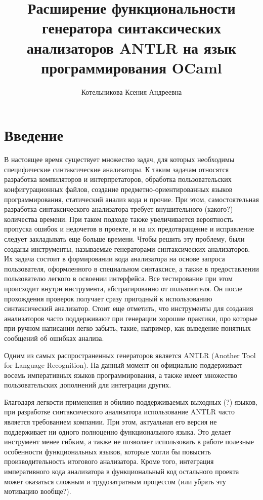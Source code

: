 \documentclass{article}
\title{Расширение функциональности генератора синтаксических анализаторов ANTLR на язык программирования OCaml}
\author{Котельникова Ксения Андреевна}
\begin{document}
\maketitle

\section{Введение}

В настоящее время существует множество задач, для которых необходимы специфические синтаксические анализаторы. 
К таким задачам относятся разработка компиляторов и интерпретаторов, обработка пользовательских конфигурационных файлов, создание предметно-ориентированных языков программирования, статический анализ кода и прочие. 
При этом, самостоятельная разработка синтаксического анализатора требует внушительного (какого?) количества времени.
При таком подходе также увеличивается вероятность пропуска ошибок и недочетов в проекте, и на их предотвращение и исправление следует закладывать еще больше времени.
Чтобы решить эту проблему, были созданы инструменты, называемые генераторами синтаксических анализаторов. 
Их задача состоит в формировании кода анализатора на основе запроса пользователя, оформленного в специальном синтаксисе, а также в предоставлении пользователю легкого в освоении интерфейса. 
Все тестирование при этом происходит внутри инструмента, абстрагированно от пользователя.
Он после прохождения проверок получает сразу пригодный к использованию синтаксический анализатор.
Стоит еще отметить, что инструменты для создания анализаторов часто поддерживают при генерации хорошие практики, про которые при ручном написании легко забыть, такие, например, как выведение понятных сообщений об ошибках анализа.

Одним из самых распространенных генераторов является ANTLR (Another Tool for Language Recognition). 
На данный момент он официально поддерживает восемь императивных языков программирования, а также имеет множество пользовательских дополнений для интеграции других. 

Благодаря легкости применения и обилию поддерживаемых выходных (?) языков, при разработке синтаксического анализатора использование ANTLR часто является требованием компании. 
При этом, актуальная его версия не поддерживает ни одного полноценно функционального языка. 
Это делает инструмент менее гибким, а также не позволяет использовать в работе полезные особенности функциональных языков, которые могли бы повысить производительность итогового анализатора.
Кроме того, интеграция императивного кода анализатора в функциональный код остального проекта может оказаться сложным и трудозатратным процессом (или убрать эту мотивацию вообще?).
\end{document}
